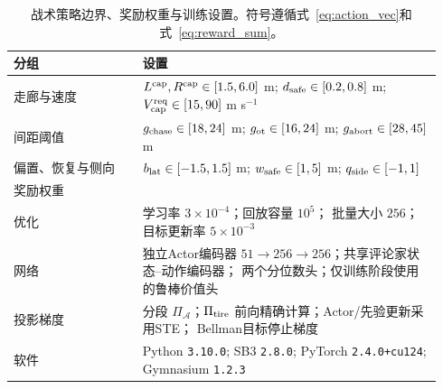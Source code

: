 \documentclass[final,5p,twocolumn]{elsarticle}
\begin{document}
\begin{table}[t]
\centering
\scriptsize
\caption{战术策略边界、奖励权重与训练设置。符号遵循式~\eqref{eq:action_vec}和
式~\eqref{eq:reward_sum}。}
\label{tab:tactical_settings}
\renewcommand{\arraystretch}{0.98}
\begin{tabular}{@{}p{0.29\linewidth}p{0.65\linewidth}@{}}
\toprule
分组 & 设置 \\
\midrule
走廊与速度 & $L^{\rm cap},R^{\rm cap}\in[1.5,6.0]$ m;
$d_{\rm safe}\in[0.2,0.8]$ m;
$V_{\rm cap}^{\rm req}\in[15,90]$ m s$^{-1}$ \\
间距阈值 & $g_{\rm chase}\in[18,24]$ m;
$g_{\rm ot}\in[16,24]$ m; $g_{\rm abort}\in[28,45]$ m \\
偏置、恢复与侧向 & $b_{\rm lat}\in[-1.5,1.5]$ m;
$w_{\rm safe}\in[1,5]$ m; $q_{\rm side}\in[-1,1]$ \\
奖励权重 & \resizebox{\linewidth}{!}{$\begin{gathered}
(w_{\rm ot},w_{\rm ovb},w_{\rm col},w_{\rm lat},w_{\rm crush},w_{\rm app},\\
w_{\rm sm},w_{\rm gs},w_{\rm sbs},w_{\rm wide})\\
=(30,-20,-100,-2,-5,3,-0.1,-0.5,0.5,0.25)
\end{gathered}$} \\
优化 & 学习率 $3\times10^{-4}$；回放容量 $10^5$；
批量大小 $256$；目标更新率 $5\times10^{-3}$ \\
网络 & 独立Actor编码器 $51\!\to\!256\!\to\!256$；共享评论家状态--动作编码器；
两个分位数头；仅训练阶段使用的鲁棒价值头 \\
投影梯度 & 分段 $\Pi_{\mathcal A}$；$\Pi_{\rm tire}$ 前向精确计算；Actor/先验更新采用STE；
Bellman目标停止梯度 \\
软件 & Python \texttt{3.10.0}; SB3 \texttt{2.8.0}; PyTorch
\texttt{2.4.0+cu124}; Gymnasium \texttt{1.2.3} \\
\bottomrule
\end{tabular}
\end{table}
\end{document}
